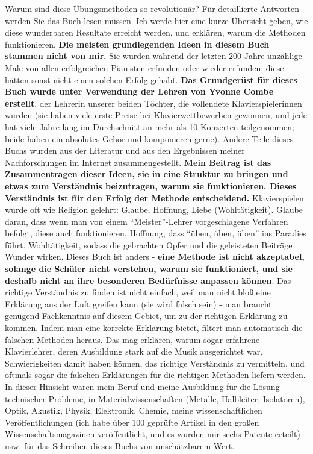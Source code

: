 Warum sind diese Übungsmethoden so revolutionär?
 Für detaillierte Antworten werden Sie das Buch lesen müssen.
 Ich werde hier eine kurze Übersicht geben, wie diese wunderbaren Resultate erreicht werden, und erklären, warum die Methoden funktionieren.
 \textbf{Die meisten grundlegenden Ideen in diesem Buch stammen nicht von mir.}
 Sie wurden während der letzten 200 Jahre unzählige Male von allen erfolgreichen Pianisten erfunden oder wieder erfunden; diese hätten sonst nicht einen solchen Erfolg gehabt.
 \textbf{Das Grundgerüst für dieses Buch wurde unter Verwendung der Lehren von Yvonne Combe erstellt}, der Lehrerin unserer beiden Töchter, die vollendete Klavierspielerinnen wurden (sie haben viele erste Preise bei Klavierwettbewerben gewonnen, und jede hat viele Jahre lang im Durchschnitt an mehr als 10 Konzerten teilgenommen; beide haben ein \hyperlink{c1iii12}{absolutes Gehör} und \hyperlink{c1iii12blatt}{komponieren} gerne).
 Andere Teile dieses Buchs wurden aus der Literatur und aus den Ergebnissen meiner Nachforschungen im Internet zusammengestellt.
 \textbf{Mein Beitrag ist das Zusammentragen dieser Ideen, sie in eine Struktur zu bringen und etwas zum Verständnis beizutragen, warum sie funktionieren.
 Dieses Verständnis ist für den Erfolg der Methode entscheidend.}
 Klavierspielen wurde oft wie Religion gelehrt: Glaube, Hoffnung, Liebe (Wohltätigkeit).
 Glaube daran, dass wenn man von einem \enquote{Meister}-Lehrer vorgeschlagene Verfahren befolgt, diese auch funktionieren.
 Hoffnung, dass \enquote{üben, üben, üben} ins Paradies führt.
 Wohltätigkeit, sodass die gebrachten Opfer und die geleisteten Beiträge Wunder wirken.
 Dieses Buch ist anders - \textbf{eine Methode ist nicht akzeptabel, solange die Schüler nicht verstehen, warum sie funktioniert, und sie deshalb nicht an ihre besonderen Bedürfnisse anpassen können}.
 Das richtige Verständnis zu finden ist nicht einfach, weil man nicht bloß eine Erklärung aus der Luft greifen kann (sie wird falsch sein) - man braucht genügend Fachkenntnis auf diesem Gebiet, um zu der richtigen Erklärung zu kommen.
 Indem man eine korrekte Erklärung bietet, filtert man automatisch die falschen Methoden heraus.
 Das mag erklären, warum sogar erfahrene Klavierlehrer, deren Ausbildung stark auf die Musik ausgerichtet war, Schwierigkeiten damit haben können, das richtige Verständnis zu vermitteln, und oftmals sogar die falschen Erklärungen für die richtigen Methoden liefern werden.
 In dieser Hinsicht waren mein Beruf und meine Ausbildung für die Lösung technischer Probleme, in Materialwissenschaften (Metalle, Halbleiter, Isolatoren), Optik, Akustik, Physik, Elektronik, Chemie, meine wissenschaftlichen Veröffentlichungen (ich habe über 100 geprüfte Artikel in den großen Wissenschaftsmagazinen veröffentlicht, und es wurden mir sechs Patente erteilt) usw. für das Schreiben dieses Buchs von unschätzbarem Wert.
